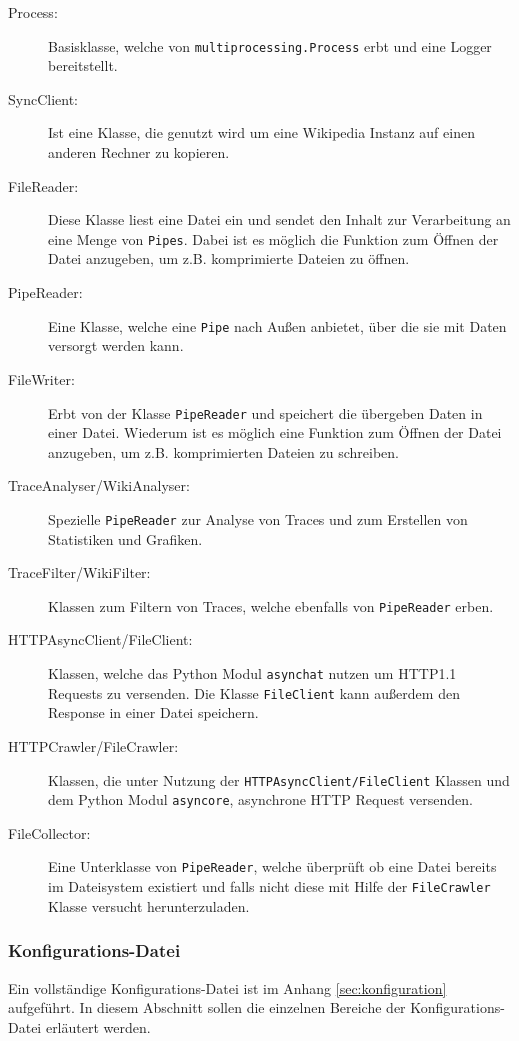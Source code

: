 \begin{description}
\item[Process:] Basisklasse, welche von \texttt{multiprocessing.Process} erbt und eine Logger bereitstellt.
\item[SyncClient:] Ist eine Klasse, die genutzt wird um eine Wikipedia Instanz auf einen anderen Rechner zu kopieren.
\item[FileReader:] Diese Klasse liest eine Datei ein und sendet den Inhalt zur Verarbeitung an eine Menge von \texttt{Pipes}. Dabei ist es möglich die Funktion zum Öffnen der Datei anzugeben, um z.B. komprimierte Dateien zu öffnen.
\item[PipeReader:] Eine Klasse, welche eine \texttt{Pipe} nach Außen anbietet, über die sie mit Daten versorgt werden kann.
\item[FileWriter:] Erbt von der Klasse \texttt{PipeReader} und speichert die übergeben Daten in einer Datei. Wiederum ist es möglich eine Funktion zum Öffnen der Datei anzugeben, um z.B. komprimierten Dateien zu schreiben.
\item[TraceAnalyser/WikiAnalyser:] Spezielle \texttt{PipeReader} zur Analyse von Traces und zum Erstellen von Statistiken und Grafiken.
\item[TraceFilter/WikiFilter:] Klassen zum Filtern von Traces, welche ebenfalls von \texttt{PipeReader} erben.
\item[HTTPAsyncClient/FileClient:] Klassen, welche das Python Modul \texttt{asynchat} nutzen um HTTP1.1 Requests zu versenden. Die Klasse \texttt{FileClient} kann außerdem den Response in einer Datei speichern.
\item[HTTPCrawler/FileCrawler:] Klassen, die unter Nutzung der \texttt{HTTPAsyncClient/FileClient} Klassen und dem Python Modul \texttt{asyncore}, asynchrone HTTP Request versenden.
\item[FileCollector:] Eine Unterklasse von \texttt{PipeReader}, welche überprüft ob eine Datei bereits im Dateisystem existiert und falls nicht diese mit Hilfe der \texttt{FileCrawler} Klasse versucht herunterzuladen.
\end{description}

\subsubsection{Konfigurations-Datei}
\label{sec:konfigurationsdatei}

Ein vollständige Konfigurations-Datei ist im Anhang \ref{sec:konfiguration} aufgeführt. In diesem Abschnitt sollen die einzelnen Bereiche der Konfigurations-Datei erläutert werden.


